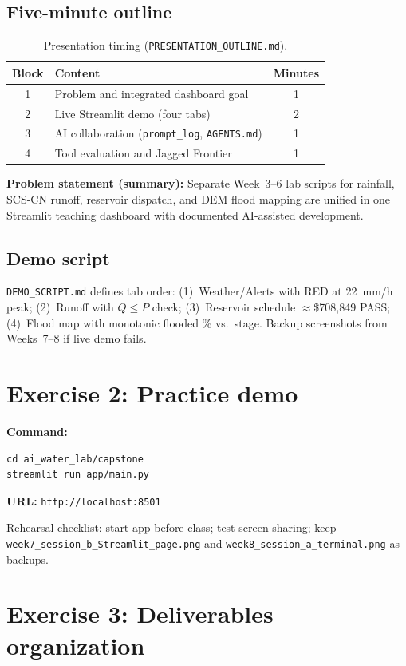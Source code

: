 \documentclass[11pt,a4paper]{article}
\begin{document}
\subsection{Five-minute outline}
\begin{table}[htbp]
  \centering
  \caption{Presentation timing (\texttt{PRESENTATION\_OUTLINE.md}).}
  \label{tab:timing}
  \begin{tabular}{@{}clc@{}}
    \toprule
    Block & Content & Minutes \\
    \midrule
    1 & Problem and integrated dashboard goal & 1 \\
    2 & Live Streamlit demo (four tabs) & 2 \\
    3 & AI collaboration (\texttt{prompt\_log}, \texttt{AGENTS.md}) & 1 \\
    4 & Tool evaluation and Jagged Frontier & 1 \\
    \bottomrule
  \end{tabular}
\end{table}

\textbf{Problem statement (summary):} Separate Week~3--6 lab scripts for rainfall, SCS-CN runoff, reservoir dispatch, and DEM flood mapping are unified in one Streamlit teaching dashboard with documented AI-assisted development.

\subsection{Demo script}
\texttt{DEMO\_SCRIPT.md} defines tab order: (1)~Weather/Alerts with RED at 22~mm/h peak; (2)~Runoff with $Q \le P$ check; (3)~Reservoir schedule $\approx$\$708{,}849 PASS; (4)~Flood map with monotonic flooded \% vs.\ stage. Backup screenshots from Weeks~7--8 if live demo fails.

\section{Exercise 2: Practice demo}

\textbf{Command:}
\begin{verbatim}
cd ai_water_lab/capstone
streamlit run app/main.py
\end{verbatim}
\textbf{URL:} \texttt{http://localhost:8501}

Rehearsal checklist: start app before class; test screen sharing; keep \texttt{week7\_session\_b\_Streamlit\_page.png} and \texttt{week8\_session\_a\_terminal.png} as backups.

\section{Exercise 3: Deliverables organization}
\end{document}
